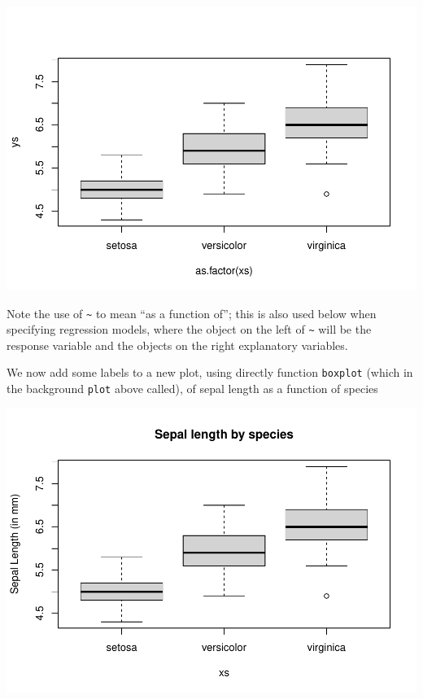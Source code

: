\documentclass[
]{article}
\newenvironment{Shaded}{\begin{snugshade}}{\end{snugshade}}
\newcommand{\AttributeTok}[1]{\textcolor[rgb]{0.13,0.29,0.53}{#1}}
\newcommand{\CommentTok}[1]{\textcolor[rgb]{0.56,0.35,0.01}{\textit{#1}}}
\newcommand{\FunctionTok}[1]{\textcolor[rgb]{0.13,0.29,0.53}{\textbf{#1}}}
\newcommand{\NormalTok}[1]{#1}
\newcommand{\OtherTok}[1]{\textcolor[rgb]{0.56,0.35,0.01}{#1}}
\newcommand{\SpecialCharTok}[1]{\textcolor[rgb]{0.81,0.36,0.00}{\textbf{#1}}}
\newcommand{\StringTok}[1]{\textcolor[rgb]{0.31,0.60,0.02}{#1}}
\begin{document}
\includegraphics{TAMsIntro2RviaRStudioTutorial_files/figure-latex/unnamed-chunk-49-1.pdf}

Note the use of \texttt{\textasciitilde{}} to mean ``as a function of'';
this is also used below when specifying regression models, where the
object on the left of \texttt{\textasciitilde{}} will be the response
variable and the objects on the right explanatory variables.

We now add some labels to a new plot, using directly function
\texttt{boxplot} (which in the background \texttt{plot} above called),
of sepal length as a function of species

\begin{Shaded}
\end{Shaded}

\includegraphics{TAMsIntro2RviaRStudioTutorial_files/figure-latex/unnamed-chunk-50-1.pdf}
\end{document}
